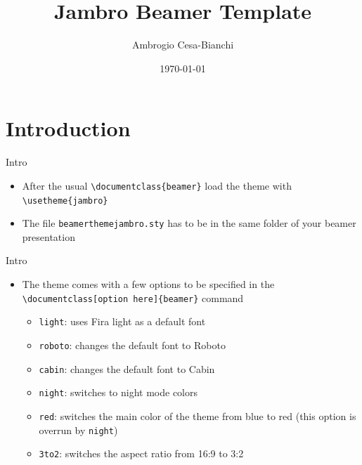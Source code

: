 \documentclass[10pt]{beamer}
\title[]{Jambro Beamer Template}
\author[]{Ambrogio Cesa-Bianchi}
\date{\today}
\begin{document}

\begin{frame}[plain]
\end{frame}


\section{Introduction}
\begin{frame}
	{Intro}
	\begin{itemize}
		\item After the usual \texttt{\textbackslash documentclass\{beamer\}} load the theme with \texttt{\textbackslash usetheme\{jambro\}}\bigskip
		\item The file \texttt{beamerthemejambro.sty} has to be in the same folder of your beamer presentation
	\end{itemize}
\end{frame}


\begin{frame}
	{Intro}
	\begin{itemize}
		\item The theme comes with a few options to be specified in the \texttt{\textbackslash documentclass[option here]\{beamer\}} command \medskip
		\begin{itemize}
			\item \texttt{light}: uses Fira light as a default font\medskip
			\item \texttt{roboto}: changes the default font to Roboto\medskip
			\item \texttt{cabin}: changes the default font to Cabin\medskip
			\item \texttt{night}: switches to night mode colors \medskip
			\item \texttt{red}: switches the main color of the theme from blue to red (this option is overrun by \texttt{night})\medskip
			\item \texttt{3to2}: switches the aspect ratio from 16:9 to 3:2
		\end{itemize}
	\end{itemize}
\end{frame}
\end{document}
